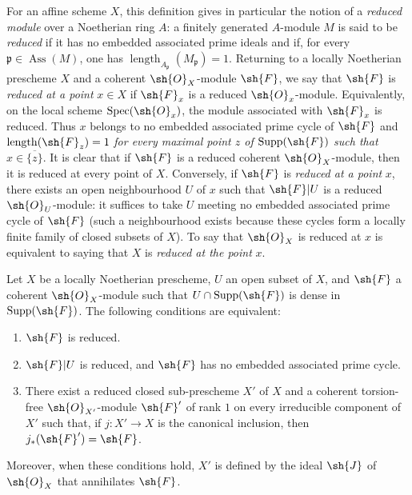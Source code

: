 For an affine scheme $X$, this definition gives in particular the notion of a \emph{reduced module} over a Noetherian ring $A$: a finitely generated $A$-module $M$ is said to be \emph{reduced} if it has no embedded associated prime ideals and if, for every $\mathfrak{p}\in\operatorname{Ass}(M)$, one has $\operatorname{length}_{A_\mathfrak{p}}(M_\mathfrak{p})=1$.
Returning to a locally Noetherian prescheme $X$ and a coherent $\sh{O}_X$-module $\sh{F}$, we say that $\sh{F}$ is \emph{reduced at a point} $x\in X$ if $\sh{F}_x$ is a reduced $\sh{O}_x$-module.  Equivalently, on the local scheme $\operatorname{Spec}(\sh{O}_x)$, the module associated with $\sh{F}_x$ is reduced.  Thus $x$ belongs to no embedded associated prime cycle of $\sh{F}$ and $\operatorname{length}(\sh{F}_z)=1$ \emph{for every maximal point $z$ of $\operatorname{Supp}(\sh{F})$ such that $x\in\overline{\{z\}}$}.
It is clear that if $\sh{F}$ is a reduced coherent $\sh{O}_X$-module, then it is reduced at every point of $X$.  Conversely, if $\sh{F}$ is \emph{reduced at a point} $x$, there exists an open neighbourhood $U$ of $x$ such that $\sh{F}|U$ is a reduced $\sh{O}_U$-module: it suffices to take $U$ meeting no embedded associated prime cycle of $\sh{F}$ (such a neighbourhood exists because these cycles form a locally finite family of closed subsets of $X$).
To say that $\sh{O}_X$ is reduced at $x$ is equivalent to saying that $X$ is \emph{reduced at the point} $x$.


\begin{proposition}[3.2.3]
\label{IV.3.2.3}
Let $X$ be a locally Noetherian prescheme, $U$ an open subset of $X$, and $\sh{F}$ a coherent $\sh{O}_X$-module such that $U\cap\operatorname{Supp}(\sh{F})$ is dense in $\operatorname{Supp}(\sh{F})$.
The following conditions are equivalent:
\begin{enumerate}
  \item[\emph{a)}] $\sh{F}$ is reduced.
  \item[\emph{b)}] $\sh{F}|U$ is reduced, and $\sh{F}$ has no embedded associated prime cycle.
  \item[\emph{c)}] There exist a reduced closed sub-prescheme $X'$ of $X$ and a coherent torsion-free $\sh{O}_{X'}$-module $\sh{F}'$ of rank $1$ on every irreducible component of $X'$ such that, if $j:X'\to X$ is the canonical inclusion, then $j_*(\sh{F}')=\sh{F}$.
\end{enumerate}
Moreover, when these conditions hold, $X'$ is defined by the ideal $\sh{J}$ of $\sh{O}_X$ that annihilates $\sh{F}$.
\end{proposition}

